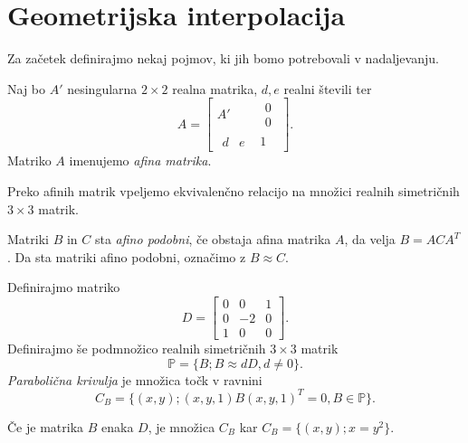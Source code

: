 \documentclass[mat1]{fmfdelo}
\newcommand{\PP}{\mathbb P}
\begin{document}
\section{Geometrijska interpolacija}

Za začetek definirajmo nekaj pojmov, ki jih bomo potrebovali v nadaljevanju.

\begin{definicija}
Naj bo $A'$ nesingularna $2\times2$ realna matrika, $d, e$ realni števili ter 
$$ A = 
\begin{bmatrix}
A' &
\begin{matrix}
0 \\
0
\end{matrix}
\\
\begin{matrix}
d & e
\end{matrix}
 & 1
\end{bmatrix}
.$$
Matriko $A$ imenujemo \emph{afina matrika}. 
\end{definicija}


Preko afinih matrik vpeljemo ekvivalenčno relacijo na množici realnih simetričnih $3 \times 3$ matrik.

\begin{definicija}
Matriki $B$ in $C$ sta \emph{afino podobni}, če obstaja afina matrika $A$, da velja $B = A C A^{T}$.
Da sta matriki afino podobni, označimo z $B \approx C$.
\end{definicija}


\begin{definicija}
Definirajmo matriko 
$$D = 
\begin{bmatrix}
0 & 0 & 1 \\
0 & -2 & 0 \\
1 & 0 & 0
\end{bmatrix}.
$$
Definirajmo še podmnožico realnih simetričnih $3 \times 3$ matrik $$\PP = \{ B; B \approx d D, d \neq 0 \} .$$
\emph{Parabolična krivulja} je množica točk v ravnini 
\begin{equation}\label{implicitna}
 C_B = \{ (x,y); (x,y,1) B (x, y, 1)^T = 0, B \in \PP \}.
 \end{equation}
\end{definicija}

Če je matrika $B$ enaka $D$, je množica $C_B$ kar $C_B = \{ (x,y); x = y^2 \}$.
\end{document}
